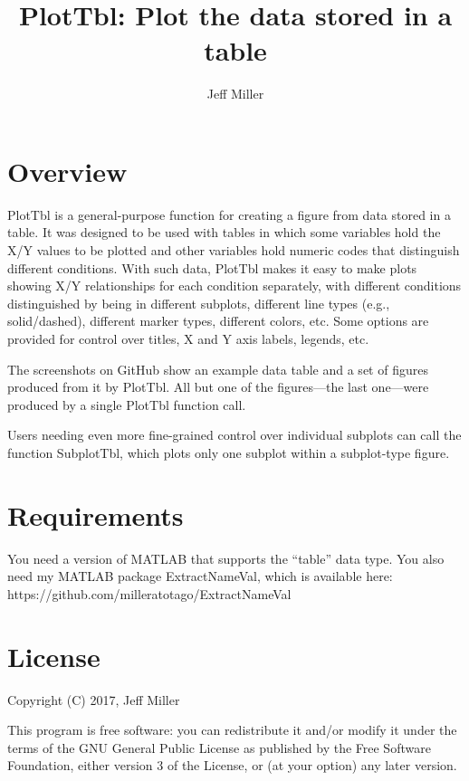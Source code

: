 \documentclass{article}
\title{PlotTbl: Plot the data stored in a table}
\author{Jeff Miller}
\begin{document}
\maketitle
\tableofcontents

\section{Overview}

PlotTbl is a general-purpose function for creating a figure from data stored in a table.
It was designed to be used with tables in which some variables hold the X/Y values to be plotted and
other variables hold numeric codes that distinguish different conditions.
With such data, PlotTbl makes it easy to make plots showing X/Y relationships
for each condition separately, with different conditions distinguished by being in different subplots,
different line types (e.g., solid/dashed), different marker types, different colors, etc.
Some options are provided for control over titles, X and Y axis labels, legends, etc.

The screenshots on GitHub show an example data table and a set of figures produced
from it by PlotTbl.
All but one of the figures---the last one---were produced by a single PlotTbl function call.

Users needing even more fine-grained control over individual subplots can call the
function SubplotTbl, which plots only one subplot within a subplot-type figure.

\section{Requirements}

You need a version of MATLAB that supports the ``table'' data type.
You also need my MATLAB package ExtractNameVal, which is available here: \\
https://github.com/milleratotago/ExtractNameVal


\section{License}

Copyright (C) 2017, Jeff Miller

This program is free software: you can redistribute it and/or modify
it under the terms of the GNU General Public License as published by
the Free Software Foundation, either version 3 of the License, or
(at your option) any later version.
\end{document}
